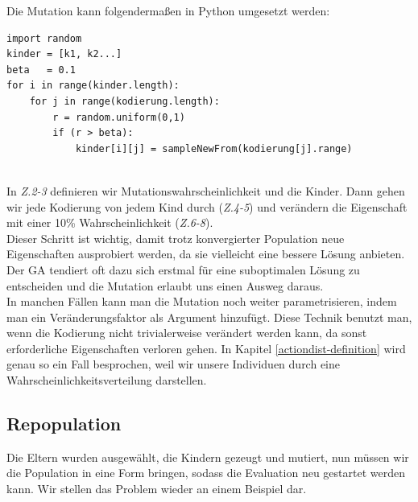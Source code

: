             Die Mutation kann folgendermaßen in Python umgesetzt werden:
            \begin{mdframed}
            \begin{verbatim}
import random
kinder = [k1, k2...]
beta   = 0.1
for i in range(kinder.length):
    for j in range(kodierung.length):
        r = random.uniform(0,1)
        if (r > beta):
            kinder[i][j] = sampleNewFrom(kodierung[j].range)
            \end{verbatim}
            \end{mdframed}
            \hfill \\[1mm]
            \noindent
            In \textit{Z.2-3} definieren wir Mutationswahrscheinlichkeit und die Kinder. Dann gehen wir jede Kodierung von jedem Kind durch (\textit{Z.4-5}) und verändern die Eigenschaft mit einer 10\% Wahrscheinlichkeit (\textit{Z.6-8}).\\

            \noindent
            Dieser Schritt ist wichtig, damit trotz konvergierter Population neue Eigenschaften ausprobiert werden, da sie vielleicht eine bessere Lösung anbieten. Der GA tendiert oft dazu sich erstmal für eine suboptimalen Lösung zu entscheiden und die Mutation erlaubt uns einen Ausweg daraus. \\

            \noindent
            In manchen Fällen kann man die Mutation noch weiter parametrisieren, indem man ein Veränderungsfaktor als Argument hinzufügt. Diese Technik benutzt man, wenn die Kodierung nicht trivialerweise verändert werden kann, da sonst erforderliche Eigenschaften verloren gehen. In Kapitel \ref{actiondist-definition} wird genau so ein Fall besprochen, weil wir unsere Individuen durch eine Wahrscheinlichkeitsverteilung darstellen. 

\newpage

        \subsection{Repopulation}
            Die Eltern wurden ausgewählt, die Kindern gezeugt und mutiert, nun müssen wir die Population in eine Form bringen, sodass die Evaluation neu gestartet werden kann. Wir stellen das Problem wieder an einem Beispiel dar.\\

